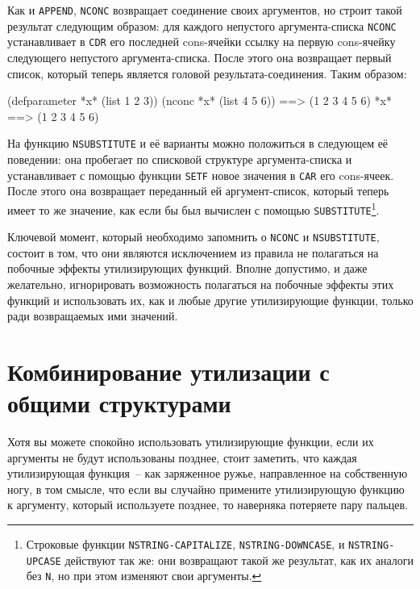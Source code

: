 Как и \lstinline{APPEND}, \lstinline{NCONC} возвращает соединение своих аргументов, но строит такой
результат следующим образом: для каждого непустого аргумента-списка \lstinline{NCONC}
устанавливает в \lstinline{CDR} его последней cons-ячейки ссылку на первую cons-ячейку
следующего непустого аргумента-списка. После этого она возвращает первый список, который
теперь является головой результата-соединения. Таким образом:

\begin{myverb}
(defparameter *x* (list 1 2 3))
(nconc *x* (list 4 5 6)) ==> (1 2 3 4 5 6)
*x*                      ==> (1 2 3 4 5 6)
\end{myverb}

На функцию \lstinline{NSUBSTITUTE} и её варианты можно положиться в следующем её поведении: она
пробегает по списковой структуре аргумента-списка и устанавливает с помощью функции
\lstinline{SETF} новое значения в \lstinline{CAR} его cons-ячеек. После этого она возвращает
переданный ей аргумент-список, который теперь имеет то же значение, как если бы был
вычислен с помощью \lstinline{SUBSTITUTE}\footnote{Строковые функции
  \lstinline{NSTRING-CAPITALIZE}, \lstinline{NSTRING-DOWNCASE}, и \lstinline{NSTRING-UPCASE} действуют
  так же: они возвращают такой же результат, как их аналоги без \lstinline{N}, но при этом
  изменяют свои аргументы.}\hspace{\footnotenegspace}.

Ключевой момент, который необходимо запомнить о \lstinline{NCONC} и \lstinline{NSUBSTITUTE}, состоит
в том, что они являются исключением из правила не полагаться на побочные эффекты
утилизирующих функций. Вполне допустимо, и даже желательно, игнорировать возможность
полагаться на побочные эффекты этих функций и использовать их, как и любые другие
утилизирующие функции, только ради возвращаемых ими значений.

\section{Комбинирование утилизации с общими структурами}

Хотя вы можете спокойно использовать утилизирующие функции, если их аргументы не будут
использованы позднее, стоит заметить, что каждая утилизирующая функция~-- как заряженное
ружье, направленное на собственную ногу, в том смысле, что если вы случайно примените
утилизирующую функцию к аргументу, который используете позднее, то наверняка потеряете
пару пальцев.


